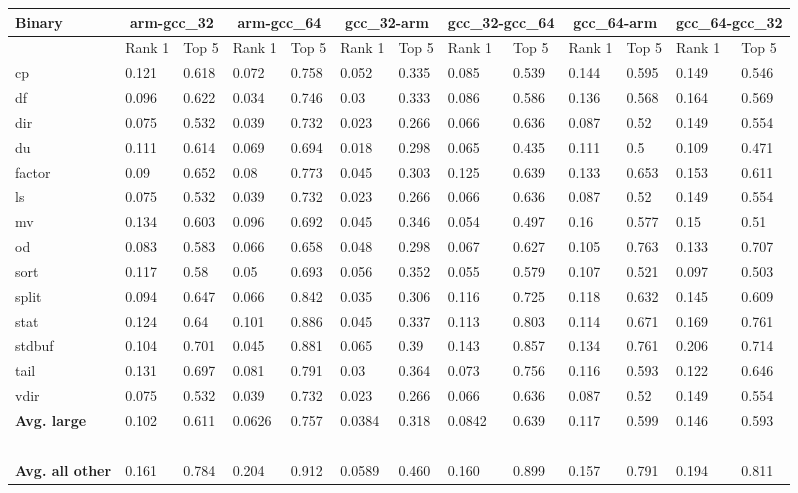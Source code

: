 \begin{appendices}
\begin{table}[!ht]
\begin{center}
\begin{tabular}{ | l | l | l | l | l | l | l | l | l | l | l | l | l | }
\hline
		Binary & \multicolumn{2}{c|}{arm-gcc\_32} & \multicolumn{2}{c|}{arm-gcc\_64}  & \multicolumn{2}{c|}{gcc\_32-arm}  & \multicolumn{2}{c|}{gcc\_32-gcc\_64} & \multicolumn{2}{c|}{gcc\_64-arm}  & \multicolumn{2}{c|}{gcc\_64-gcc\_32}  \\ \hline
	 & Rank 1 & Top 5 & Rank 1 & Top 5 & Rank 1 & Top 5 & Rank 1 & Top 5 & Rank 1 & Top 5 & Rank 1 & Top 5 \\ \hline
	cp & 0.121 & 0.618 & 0.072 & 0.758 & 0.052 & 0.335 & 0.085 & 0.539 & 0.144 & 0.595 & 0.149 & 0.546 \\ \hline
	df & 0.096 & 0.622 & 0.034 & 0.746 & 0.03 & 0.333 & 0.086 & 0.586 & 0.136 & 0.568 & 0.164 & 0.569 \\ \hline
	dir & 0.075 & 0.532 & 0.039 & 0.732 & 0.023 & 0.266 & 0.066 & 0.636 & 0.087 & 0.52 & 0.149 & 0.554 \\ \hline
	du & 0.111 & 0.614 & 0.069 & 0.694 & 0.018 & 0.298 & 0.065 & 0.435 & 0.111 & 0.5 & 0.109 & 0.471 \\ \hline
	factor & 0.09 & 0.652 & 0.08 & 0.773 & 0.045 & 0.303 & 0.125 & 0.639 & 0.133 & 0.653 & 0.153 & 0.611 \\ \hline
	ls & 0.075 & 0.532 & 0.039 & 0.732 & 0.023 & 0.266 & 0.066 & 0.636 & 0.087 & 0.52 & 0.149 & 0.554 \\ \hline
	mv & 0.134 & 0.603 & 0.096 & 0.692 & 0.045 & 0.346 & 0.054 & 0.497 & 0.16 & 0.577 & 0.15 & 0.51 \\ \hline
	od & 0.083 & 0.583 & 0.066 & 0.658 & 0.048 & 0.298 & 0.067 & 0.627 & 0.105 & 0.763 & 0.133 & 0.707 \\ \hline
	sort & 0.117 & 0.58 & 0.05 & 0.693 & 0.056 & 0.352 & 0.055 & 0.579 & 0.107 & 0.521 & 0.097 & 0.503 \\ \hline
	split & 0.094 & 0.647 & 0.066 & 0.842 & 0.035 & 0.306 & 0.116 & 0.725 & 0.118 & 0.632 & 0.145 & 0.609 \\ \hline
	stat & 0.124 & 0.64 & 0.101 & 0.886 & 0.045 & 0.337 & 0.113 & 0.803 & 0.114 & 0.671 & 0.169 & 0.761 \\ \hline
	stdbuf & 0.104 & 0.701 & 0.045 & 0.881 & 0.065 & 0.39 & 0.143 & 0.857 & 0.134 & 0.761 & 0.206 & 0.714 \\ \hline
	tail & 0.131 & 0.697 & 0.081 & 0.791 & 0.03 & 0.364 & 0.073 & 0.756 & 0.116 & 0.593 & 0.122 & 0.646 \\ \hline
	vdir & 0.075 & 0.532 & 0.039 & 0.732 & 0.023 & 0.266 & 0.066 & 0.636 & 0.087 & 0.52 & 0.149 & 0.554 \\ \hline
	\textbf{Avg. large} & 0.102 & 0.611 & 0.0626 & 0.757 & 0.0384 & 0.318 & 0.0842 & 0.639 & 0.117 & 0.599 & 0.146 & 0.593 \\ \hline
	\  & \  & \  & \  & \  & \  & \  & \  & \  & \  & \  & \  & \  \\ \hline
	\textbf{Avg. all other} & 0.161 & 0.784 & 0.204 & 0.912 & 0.0589 & 0.460 & 0.160 & 0.899 & 0.157 & 0.791 & 0.194 & 0.811 \\ \hline
\end{tabular}
\end{center}
\end{table}



\end{appendices}
